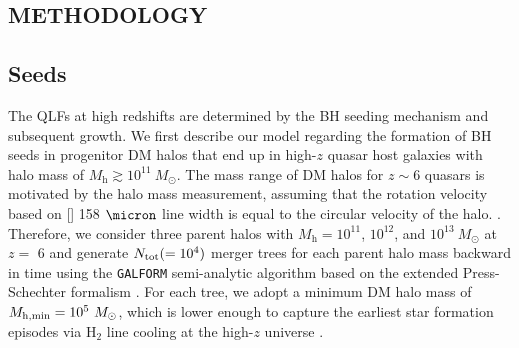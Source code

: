 \documentclass[twocolumn, twocolappendix]{aastex63}
\newcommand{\Msun}{M_\odot}
\newcommand{\Mh}{M_\mathrm{h}}
\begin{document}
\begin{CJK*}{UTF8}{gbsn}
\vspace{5mm}
\section{METHODOLOGY}\label{sec:method}

\vspace{2mm}
\subsection{Seeds}\label{sec:seed}
The QLFs at high redshifts are determined by the BH seeding mechanism and subsequent growth. 
We first describe our model regarding the formation of BH seeds in progenitor DM halos 
that end up in high-$z$ quasar host galaxies with halo mass of $\Mh \gtrsim 10^{11}~\Msun$.
The mass range of DM halos for $z\sim 6$ quasars is motivated by the halo mass measurement, 
assuming that the rotation velocity based on [] 158 $\micron$ line width is equal to the circular velocity of the halo.
\citep{2002ApJ...578...90F,2013ApJ...773...44W,2019ApJ...872L..29S}.
Therefore, we consider three parent halos with $\Mh = 10^{11}$, $10^{12}$, and $10^{13} ~\Msun$ at $z=$ 6
and generate $N_{\rm tot} (= 10^4)$ merger trees for each parent halo mass backward in time using the {\tt GALFORM} 
semi-analytic algorithm based on the extended Press-Schechter formalism 
\citep{1974ApJ...187..425P,2000MNRAS.319..168C,2008MNRAS.383..557P}.
For each tree, we adopt a minimum DM halo mass of $M_{\rm h,min}=10^5~\Msun$, which is lower enough to capture 
the earliest star formation episodes via H$_2$ line cooling at the high-$z$ universe \citep{1996ApJ...464..523H,1997ApJ...474....1T}.



\end{CJK*}
\end{document}

